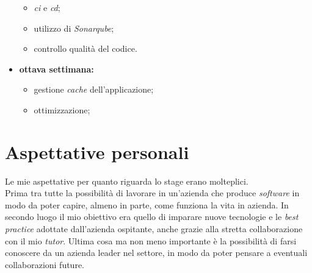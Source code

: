 \begin{itemize}
    \begin{itemize}
        \item \textit{\gls{ci}} e \textit{\gls{cd}};
        \item utilizzo di \textit{Sonarqube};
        \item controllo qualità del codice.
    \end{itemize}
    \item \textbf{ottava settimana:}
    \begin{itemize}
        \item gestione \textit{cache} dell'applicazione;
        \item ottimizzazione;
    \end{itemize}
\end{itemize}

\section{Aspettative personali}
Le mie aspettative per quanto riguarda lo stage erano molteplici.
\\Prima tra tutte la possibilità di lavorare in un'azienda che produce \textit{software} in modo da poter capire, almeno in parte, come funziona la vita in azienda.
In secondo luogo il mio obiettivo era quello di imparare nuove tecnologie e le \textit{best practice} adottate dall'azienda ospitante, anche grazie alla stretta collaborazione con il mio \textit{tutor}.
Ultima cosa ma non meno importante è la possibilità di farsi conoscere da un azienda leader nel settore, in modo da poter pensare a eventuali collaborazioni future.